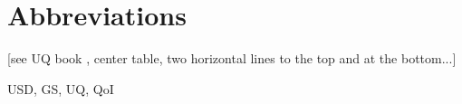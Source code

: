 

\section*{Abbreviations} %
\thispagestyle{plain} %


[see UQ book , center table, two horizontal lines to the top and at the bottom...]


USD, GS, UQ, QoI